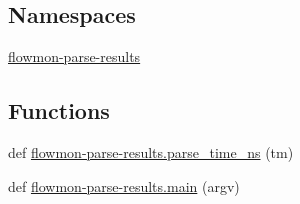 \subsection*{Namespaces}
\begin{DoxyCompactItemize}
\item 
 \hyperlink{namespaceflowmon-parse-results}{flowmon-\/parse-\/results}
\end{DoxyCompactItemize}
\subsection*{Functions}
\begin{DoxyCompactItemize}
\item 
def \hyperlink{namespaceflowmon-parse-results_a5612b6aed0ce819ee4f6fd3dbe251622}{flowmon-\/parse-\/results.\+parse\+\_\+time\+\_\+ns} (tm)
\item 
def \hyperlink{namespaceflowmon-parse-results_a5d1c01dbc9b4217383d9b577f790496a}{flowmon-\/parse-\/results.\+main} (argv)
\end{DoxyCompactItemize}
